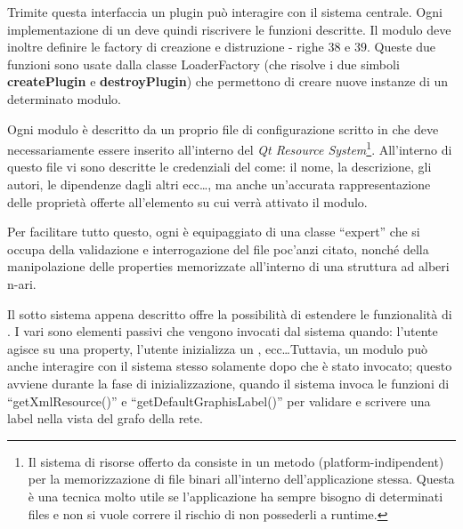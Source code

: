 Trimite questa interfaccia un plugin può interagire con il sistema centrale. Ogni implementazione di un \plugin{} deve quindi riscrivere le funzioni descritte. Il modulo deve inoltre definire le factory di creazione e distruzione - righe $38$ e $39$. Queste due funzioni sono usate dalla classe LoaderFactory (che risolve i due simboli \textbf{createPlugin} e \textbf{destroyPlugin}) che permettono di creare nuove instanze di un determinato modulo.


Ogni modulo è descritto da un proprio file di configurazione scritto in \xml{} che deve necessariamente essere inserito all'interno del \emph{Qt Resource System}\footnote{Il sistema di risorse offerto da \qt{} consiste in un metodo (platform-indipendent) per la memorizzazione di file binari all'interno dell'applicazione stessa. Questa è una tecnica molto utile se l'applicazione ha sempre bisogno di determinati files e non si vuole correre il rischio di non possederli a runtime.}. All'interno di questo file vi sono descritte le credenziali del \plugin{} come: il nome, la descrizione, gli autori, le dipendenze dagli altri \plugin{} ecc\ldots, ma anche un'accurata rappresentazione delle proprietà offerte all'elemento su cui verrà attivato il modulo.

Per facilitare tutto questo, ogni \proxy{} è equipaggiato di una classe ``expert'' che si occupa della validazione e interrogazione del file \xml{} poc'anzi citato, nonché della manipolazione delle properties memorizzate all'interno di una struttura ad alberi n-ari.

Il sotto sistema appena descritto offre la possibilità di estendere le funzionalità di \visualnetkit{}. I vari \plugin{} sono elementi passivi che vengono invocati dal sistema quando: l'utente agisce su una property, l'utente inizializza un \plugin{}, ecc\ldots Tuttavia, un modulo può anche interagire con il sistema stesso solamente dopo che è stato invocato; questo avviene durante la fase di inizializzazione, quando il sistema invoca le funzioni di ``getXmlResource()'' e ``getDefaultGraphisLabel()'' per validare e scrivere una label nella vista del grafo della rete.

